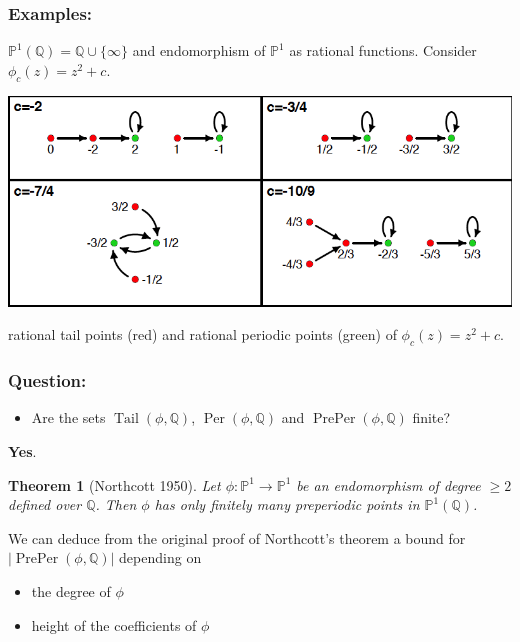 \documentclass{beamer}
\def\PP{{\mathbb P}}
\def\QQ{{\mathbb Q}}
\DeclareMathOperator{\Tail}{Tail}
\DeclareMathOperator{\Per}{Per}
\DeclareMathOperator{\PrePer}{PrePer}
\theoremstyle{thmstyle}
\theoremstyle{thmstyle}
\newtheorem*{mythm}{Theorem}
\theoremstyle{mystyle}
\theoremstyle{qstnstyle}
\begin{document}
\begin{frame}
\frametitle{Examples:}
$\PP^1(\QQ)=\QQ\cup \{\infty \}$ and endomorphism of $\PP^1$ as rational functions. Consider $\phi_c(z)=z^2+c$.
\pause

\begin{center}
\includegraphics[width=1.0\linewidth]{placeholder4}
\end{center}

rational tail points (red) and rational periodic points (green) of  $\phi_c(z)=z^2+c$.
\end{frame}

\begin{frame}
\frametitle{Question:}
\begin{itemize}
\item Are the sets $\Tail(\phi,\QQ)$, $\Per(\phi,\QQ)$ and $\PrePer(\phi,\QQ)$ finite? 
\end{itemize}
\pause \textbf{Yes}. 
\vspace{6mm}\pause

\begin{mythm}[Northcott 1950]
Let $\phi : \PP^1 \to \PP^1$ be an endomorphism of degree $\geq{2}$
defined over $\QQ$. Then $\phi$ has
only finitely many preperiodic points in $\PP^1(\QQ)$.
\end{mythm}

\vspace{6mm} \pause
We can deduce from the original proof of Northcott's theorem a bound for $|\PrePer(\phi,\QQ)|$ depending on
\begin{itemize}
\item the degree of $\phi$
\item height of the coefficients of $\phi$


 
\end{itemize}
\end{frame}
\end{document}
